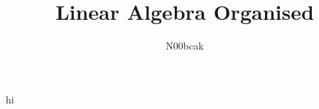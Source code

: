 \documentclass[a4paper,14pt]{article}
\begin{document}
	
	\title{Linear Algebra Organised}
	\author{N00bcak}
	
	\date{}
	\maketitle
	
	\tableofcontents
	\newpage
	hi
\end{document}
